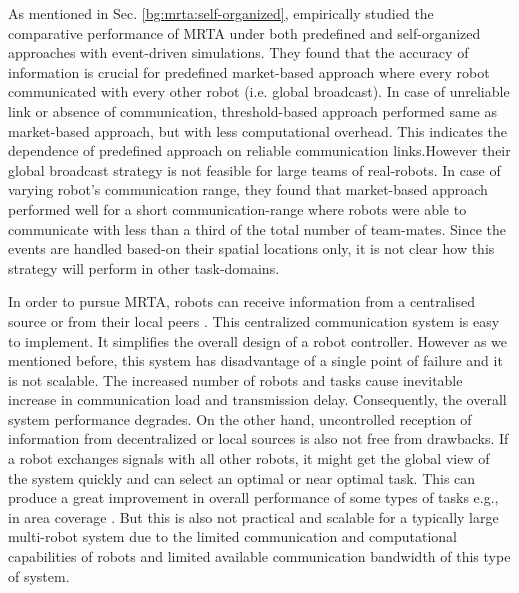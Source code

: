 As mentioned in Sec. \ref{bg:mrta:self-organized},  empirically studied the comparative performance of MRTA under both predefined and self-organized approaches with event-driven simulations. They found that the accuracy of information is crucial for predefined market-based approach where every robot communicated with every other robot (i.e. global broadcast). In case of unreliable link or absence of communication, threshold-based approach performed same as market-based approach, but with less computational overhead. This indicates the dependence of predefined approach on reliable communication links.However their global broadcast strategy is not feasible for large teams of real-robots. In case of varying robot's communication range,  they found that market-based approach performed well for a short communication-range where robots were able to communicate with less than a third of the total number of team-mates. Since the events are handled based-on their spatial locations only, it is not clear how this strategy  will perform in other task-domains.  
  
In order to pursue MRTA, robots can receive information from a centralised source \cite{Krieger+2000} or from their local peers \cite{Agassounon+2002}. This centralized communication system is easy to implement. It simplifies the overall design of a robot controller. However as we mentioned before, this system has disadvantage of a single point of failure and it is not scalable. The increased number of robots and tasks cause inevitable increase in communication load and transmission delay. Consequently, the overall system performance degrades. On the other hand, uncontrolled reception of information from decentralized or local sources is also not free from drawbacks. If a robot exchanges signals with all other robots, it might get the global view of the system quickly and can select an optimal or near optimal task. This can produce a great improvement in overall performance of some types of tasks e.g., in area coverage \cite{Rutishauser+2009}. But this is also not practical and scalable for a typically large multi-robot system due to the limited communication and computational capabilities of robots and limited available communication bandwidth of this type of system.

